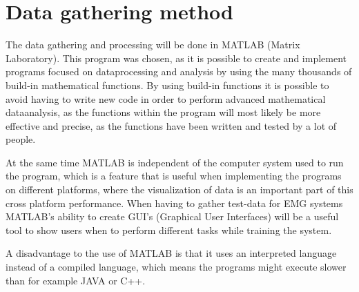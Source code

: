 \section{Data gathering method}

The data gathering and processing will be done in MATLAB (Matrix Laboratory). This program was chosen, as it is possible to create and implement programs focused on dataprocessing and analysis by using the many thousands of build-in mathematical functions. By using build-in functions it is possible to avoid having to write new code in order to perform advanced mathematical dataanalysis, as the functions within the program will most likely be more effective and precise, as the functions have been written and tested by a lot of people. \cite{chapman2013}

At the same time MATLAB is independent of the computer system used to run the program, which is a feature that is useful when implementing the programs on different platforms, where the visualization of data is an important part of this cross platform performance. When having to gather test-data for EMG systems MATLAB's ability to create GUI's (Graphical User Interfaces) will be a useful tool to show users when to perform different tasks while training the system. \cite{chapman2013}

A disadvantage to the use of MATLAB is that it uses an interpreted language instead of a compiled language, which means the programs might execute slower than for example JAVA or C++. \cite{chapman2013}

